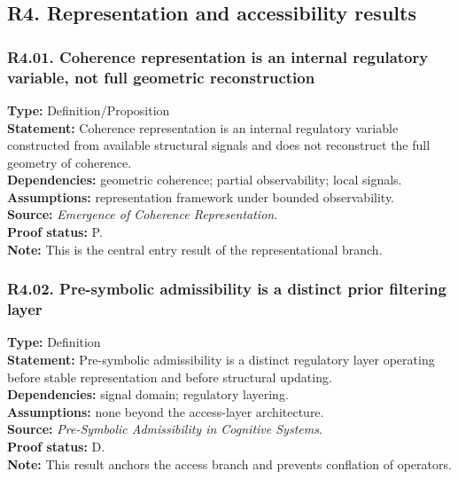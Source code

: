 \documentclass[12pt]{article}
\begin{document}
	\subsection{R4. Representation and accessibility results}
	
	\subsubsection*{R4.01. Coherence representation is an internal regulatory variable, not full geometric reconstruction}
	\textbf{Type:} Definition/Proposition \\
	\textbf{Statement:} Coherence representation is an internal regulatory variable constructed from
	available structural signals and does not reconstruct the full geometry of coherence. \\
	\textbf{Dependencies:} geometric coherence; partial observability; local signals. \\
	\textbf{Assumptions:} representation framework under bounded observability. \\
	\textbf{Source:} \emph{Emergence of Coherence Representation}. \\
	\textbf{Proof status:} P. \\
	\textbf{Note:} This is the central entry result of the representational branch.
	
	\subsubsection*{R4.02. Pre-symbolic admissibility is a distinct prior filtering layer}
	\textbf{Type:} Definition \\
	\textbf{Statement:} Pre-symbolic admissibility is a distinct regulatory layer operating before
	stable representation and before structural updating. \\
	\textbf{Dependencies:} signal domain; regulatory layering. \\
	\textbf{Assumptions:} none beyond the access-layer architecture. \\
	\textbf{Source:} \emph{Pre-Symbolic Admissibility in Cognitive Systems}. \\
	\textbf{Proof status:} D. \\
	\textbf{Note:} This result anchors the access branch and prevents conflation of operators.
	
\end{document}
